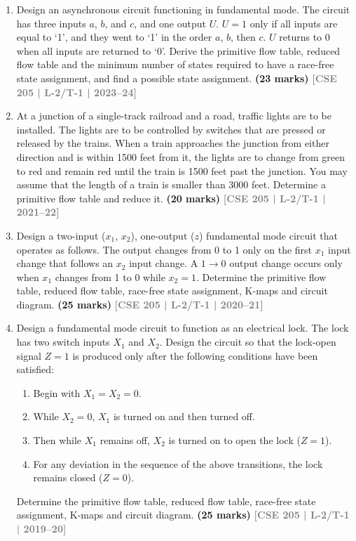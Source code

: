 \documentclass[12pt]{article}
\newcommand{\yr}[1]{\hfill\textcolor{gray}{\small\textbf{[#1]}}}
\newcommand{\mk}[1]{\textcolor{orange!70!black}{\small\textbf{(#1 marks)}}}
\begin{document}
\begin{enumerate}


\item Design an asynchronous circuit functioning in fundamental mode. The circuit has three inputs $a$, $b$, and $c$, and one output $U$. $U=1$ only if all inputs are equal to `1', and they went to `1' in the order $a$, $b$, then $c$. $U$ returns to 0 when all inputs are returned to `0'. Derive the primitive flow table, reduced flow table and the minimum number of states required to have a race-free state assignment, and find a possible state assignment.
\mk{23} \yr{CSE 205 | L-2/T-1 | 2023--24}





\item At a junction of a single-track railroad and a road, traffic lights are to be installed. The lights are to be controlled by switches that are pressed or released by the trains. When a train approaches the junction from either direction and is within 1500 feet from it, the lights are to change from green to red and remain red until the train is 1500 feet past the junction. You may assume that the length of a train is smaller than 3000 feet. Determine a primitive flow table and reduce it.
\mk{20} \yr{CSE 205 | L-2/T-1 | 2021--22}




\item Design a two-input ($x_1$, $x_2$), one-output ($z$) fundamental mode circuit that operates as follows. The output changes from 0 to 1 only on the first $x_1$ input change that follows an $x_2$ input change. A $1\to0$ output change occurs only when $x_1$ changes from 1 to 0 while $x_2=1$. Determine the primitive flow table, reduced flow table, race-free state assignment, K-maps and circuit diagram.
\mk{25} \yr{CSE 205 | L-2/T-1 | 2020--21}






\item Design a fundamental mode circuit to function as an electrical lock. The lock has two switch inputs $X_1$ and $X_2$. Design the circuit so that the lock-open signal $Z=1$ is produced only after the following conditions have been satisfied:
\begin{enumerate}
  \item Begin with $X_1 = X_2 = 0$.
  \item While $X_2 = 0$, $X_1$ is turned on and then turned off.
  \item Then while $X_1$ remains off, $X_2$ is turned on to open the lock ($Z=1$).
  \item For any deviation in the sequence of the above transitions, the lock remains closed ($Z=0$).
\end{enumerate}
Determine the primitive flow table, reduced flow table, race-free state assignment, K-maps and circuit diagram.
\mk{25} \yr{CSE 205 | L-2/T-1 | 2019--20}





\end{enumerate}
\end{document}
